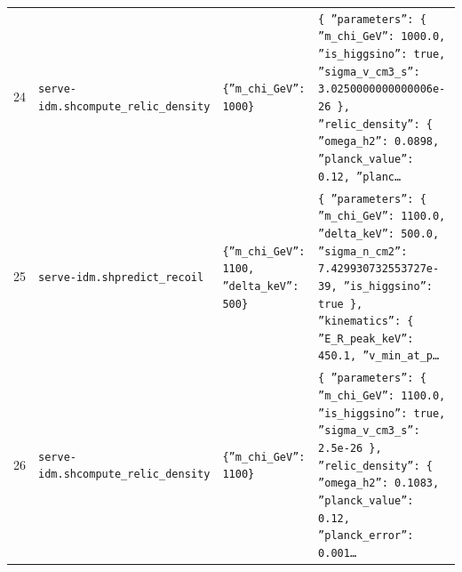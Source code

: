 \documentclass[11pt,a4paper]{article}
\begin{document}
\begin{longtable}{@{}p{}p{}p{}p{}@{}}
24 & \texttt{serve-idm.sh}\newline\texttt{compute\_\allowbreak{}relic\_\allowbreak{}density} & \texttt{\{''m\_\allowbreak{}chi\_\allowbreak{}GeV'':\allowbreak{} 1000\}\allowbreak{}} & \texttt{\{   ''parameters'':\allowbreak{} \{     ''m\_\allowbreak{}chi\_\allowbreak{}GeV'':\allowbreak{} 1000.0,\allowbreak{}     ''is\_\allowbreak{}higgsino'':\allowbreak{} true,\allowbreak{}     ''sigma\_\allowbreak{}v\_\allowbreak{}cm3\_\allowbreak{}s'':\allowbreak{} 3.0250000000000006e-26   \}\allowbreak{},\allowbreak{}   ''relic\_\allowbreak{}density'':\allowbreak{} \{     ''omega\_\allowbreak{}h2'':\allowbreak{} 0.0898,\allowbreak{}     ''planck\_\allowbreak{}value'':\allowbreak{} 0.12,\allowbreak{}     ''planc\ldots{}\allowbreak{}} \\
25 & \texttt{serve-idm.sh}\newline\texttt{predict\_\allowbreak{}recoil} & \texttt{\{''m\_\allowbreak{}chi\_\allowbreak{}GeV'':\allowbreak{} 1100,\allowbreak{} ''delta\_\allowbreak{}keV'':\allowbreak{} 500\}\allowbreak{}} & \texttt{\{   ''parameters'':\allowbreak{} \{     ''m\_\allowbreak{}chi\_\allowbreak{}GeV'':\allowbreak{} 1100.0,\allowbreak{}     ''delta\_\allowbreak{}keV'':\allowbreak{} 500.0,\allowbreak{}     ''sigma\_\allowbreak{}n\_\allowbreak{}cm2'':\allowbreak{} 7.429930732553727e-39,\allowbreak{}     ''is\_\allowbreak{}higgsino'':\allowbreak{} true   \}\allowbreak{},\allowbreak{}   ''kinematics'':\allowbreak{} \{     ''E\_\allowbreak{}R\_\allowbreak{}peak\_\allowbreak{}keV'':\allowbreak{} 450.1,\allowbreak{}     ''v\_\allowbreak{}min\_\allowbreak{}at\_\allowbreak{}p\ldots{}\allowbreak{}} \\
26 & \texttt{serve-idm.sh}\newline\texttt{compute\_\allowbreak{}relic\_\allowbreak{}density} & \texttt{\{''m\_\allowbreak{}chi\_\allowbreak{}GeV'':\allowbreak{} 1100\}\allowbreak{}} & \texttt{\{   ''parameters'':\allowbreak{} \{     ''m\_\allowbreak{}chi\_\allowbreak{}GeV'':\allowbreak{} 1100.0,\allowbreak{}     ''is\_\allowbreak{}higgsino'':\allowbreak{} true,\allowbreak{}     ''sigma\_\allowbreak{}v\_\allowbreak{}cm3\_\allowbreak{}s'':\allowbreak{} 2.5e-26   \}\allowbreak{},\allowbreak{}   ''relic\_\allowbreak{}density'':\allowbreak{} \{     ''omega\_\allowbreak{}h2'':\allowbreak{} 0.1083,\allowbreak{}     ''planck\_\allowbreak{}value'':\allowbreak{} 0.12,\allowbreak{}     ''planck\_\allowbreak{}error'':\allowbreak{} 0.001\ldots{}\allowbreak{}} \\

\end{longtable}
\end{document}
